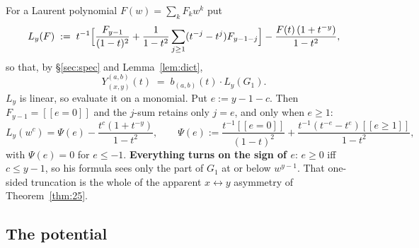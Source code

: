 \documentclass[11pt]{article}
\theoremstyle{definition}
\newcommand{\lb}{[\![}
\newcommand{\rb}{]\!]}
\begin{document}
For a Laurent polynomial $F(w)=\sum_kF_kw^k$ put
\begin{equation}\label{eq:L}
  L_y(F)\;:=\;t^{-1}\Bigl[\frac{F_{y-1}}{(1-t)^2}+\frac{1}{1-t^2}\sum_{j\ge1}(t^{-j}-t^j)F_{y-1-j}\Bigr]
  -\frac{F(t)\,(1+t^{-y})}{1-t^2},
\end{equation}
so that, by \S\ref{sec:spec} and Lemma~\ref{lem:dict},
\begin{equation}\label{eq:YbL}
  Y^{(a,b)}_{(x,y)}(t)\;=\;b_{(a,b)}(t)\cdot L_y(G_1).
\end{equation}
$L_y$ is linear, so evaluate it on a monomial. Put $e:=y-1-c$. Then $F_{y-1}=\lb e=0\rb$ and the
$j$-sum retains only $j=e$, and only when $e\ge1$:
\begin{equation}\label{eq:Lmono}
  L_y(w^c)=\Psi(e)-\frac{t^c(1+t^{-y})}{1-t^2},\qquad
  \Psi(e):=\frac{t^{-1}\lb e=0\rb}{(1-t)^2}+\frac{t^{-1}(t^{-e}-t^e)\lb e\ge1\rb}{1-t^2},
\end{equation}
with $\Psi(e)=0$ for $e\le-1$. \textbf{Everything turns on the sign of $e$}: $e\ge0$ iff $c\le y-1$,
so his formula sees only the part of $G_1$ at or below $w^{y-1}$. That one-sided truncation is the
whole of the apparent $x\leftrightarrow y$ asymmetry of Theorem~\ref{thm:25}.

\subsection{The potential}
\end{document}
